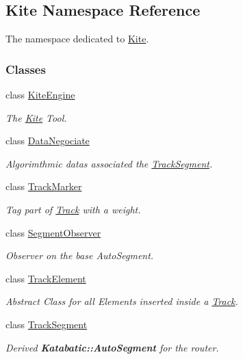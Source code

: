 \hypertarget{namespaceKite}{\subsection{Kite Namespace Reference}
\label{namespaceKite}
}


The namespace dedicated to \hyperlink{namespaceKite}{Kite}.  


\subsubsection*{Classes}
\begin{DoxyCompactItemize}
\item 
class \hyperlink{classKite_1_1KiteEngine}{Kite\-Engine}
\begin{DoxyCompactList}\small\item\em The \hyperlink{namespaceKite}{Kite} Tool. \end{DoxyCompactList}\item 
class \hyperlink{classKite_1_1DataNegociate}{Data\-Negociate}
\begin{DoxyCompactList}\small\item\em Algorimthmic datas associated the \hyperlink{classKite_1_1TrackSegment}{Track\-Segment}. \end{DoxyCompactList}\item 
class \hyperlink{classKite_1_1TrackMarker}{Track\-Marker}
\begin{DoxyCompactList}\small\item\em Tag part of \hyperlink{classKite_1_1Track}{Track} with a weight. \end{DoxyCompactList}\item 
class \hyperlink{classKite_1_1SegmentObserver}{Segment\-Observer}
\begin{DoxyCompactList}\small\item\em Observer on the base Auto\-Segment. \end{DoxyCompactList}\item 
class \hyperlink{classKite_1_1TrackElement}{Track\-Element}
\begin{DoxyCompactList}\small\item\em Abstract Class for all Elements inserted inside a \hyperlink{classKite_1_1Track}{Track}. \end{DoxyCompactList}\item 
class \hyperlink{classKite_1_1TrackSegment}{Track\-Segment}
\begin{DoxyCompactList}\small\item\em Derived {\bf Katabatic\-::\-Auto\-Segment} for the router. \end{DoxyCompactList}\item 

\end{DoxyCompactItemize}
